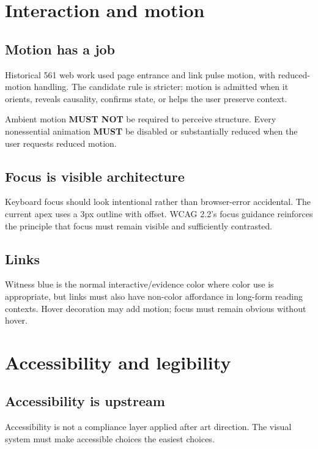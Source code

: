 \documentclass[11pt,twoside,openany]{report}
\newcommand{\MUST}{\textbf{MUST}\xspace}
\newcommand{\MUSTNOT}{\textbf{MUST NOT}\xspace}
\begin{document}
\clearpage
\chapter{Interaction and motion}

\section{Motion has a job}
Historical 561 web work used page entrance and link pulse motion, with reduced-motion handling. The candidate rule is stricter: motion is admitted when it orients, reveals causality, confirms state, or helps the user preserve context.

\begin{specbox}
Ambient motion \MUSTNOT be required to perceive structure. Every nonessential animation \MUST be disabled or substantially reduced when the user requests reduced motion.
\end{specbox}

\section{Focus is visible architecture}
Keyboard focus should look intentional rather than browser-error accidental. The current apex uses a 3px outline with offset. WCAG 2.2's focus guidance reinforces the principle that focus must remain visible and sufficiently contrasted.

\section{Links}
Witness blue is the normal interactive/evidence color where color use is appropriate, but links must also have non-color affordance in long-form reading contexts. Hover decoration may add motion; focus must remain obvious without hover.

\clearpage
\chapter{Accessibility and legibility}

\section{Accessibility is upstream}
Accessibility is not a compliance layer applied after art direction. The visual system must make accessible choices the easiest choices.
\end{document}
